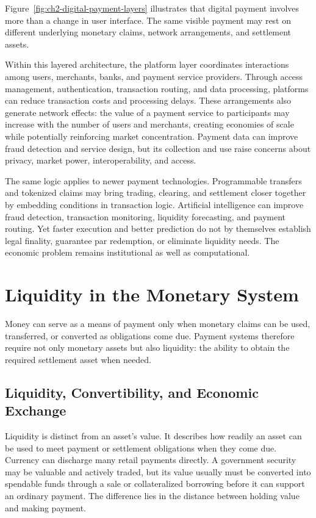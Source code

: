Figure~\ref{fig:ch2-digital-payment-layers} illustrates that digital payment involves more than a change in user interface. The same visible payment may rest on different underlying monetary claims, network arrangements, and settlement assets.

Within this layered architecture, the platform layer coordinates interactions among users, merchants, banks, and payment service providers. Through access management, authentication, transaction routing, and data processing, platforms can reduce transaction costs and processing delays. These arrangements also generate network effects: the value of a payment service to participants may increase with the number of users and merchants, creating economies of scale while potentially reinforcing market concentration. Payment data can improve fraud detection and service design, but its collection and use raise concerns about privacy, market power, interoperability, and access.

The same logic applies to newer payment technologies. 
Programmable transfers and tokenized claims may bring trading, clearing, and settlement closer together by embedding conditions in transaction logic. Artificial intelligence can improve fraud detection, transaction monitoring, liquidity forecasting, and payment routing. Yet faster execution and better prediction do not by themselves establish legal finality, guarantee par redemption, or eliminate liquidity needs. The economic problem remains institutional as well as computational.

\section{Liquidity in the Monetary System}

Money can serve as a means of payment only when monetary claims can be used, transferred, or converted as obligations come due. Payment systems therefore require not only monetary assets but also liquidity: the ability to obtain the required settlement asset when needed.

\subsection{Liquidity, Convertibility, and Economic Exchange}

Liquidity is distinct from an asset's value. It describes how readily an asset can be used to meet payment or settlement obligations when they come due. Currency can discharge many retail payments directly. A government security may be valuable and actively traded, but its value usually must be converted into spendable funds through a sale or collateralized borrowing before it can support an ordinary payment. The difference lies in the distance between holding value and making payment.

